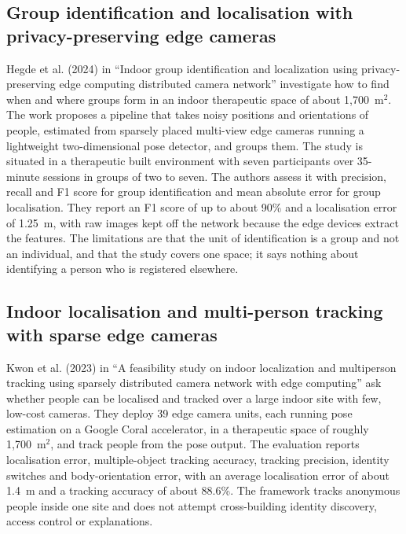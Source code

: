 \documentclass[12pt,a4paper,oneside]{report}
\begin{document}
\subsection{Group identification and localisation with privacy-preserving edge cameras}
Hegde et al. (2024) in ``Indoor group identification and localization using privacy-preserving edge computing distributed camera network'' \cite{ref1} investigate how to find when and where groups form in an indoor therapeutic space of about 1,700~m$^2$. The work proposes a pipeline that takes noisy positions and orientations of people, estimated from sparsely placed multi-view edge cameras running a lightweight two-dimensional pose detector, and groups them. The study is situated in a therapeutic built environment with seven participants over 35-minute sessions in groups of two to seven. The authors assess it with precision, recall and F1 score for group identification and mean absolute error for group localisation. They report an F1 score of up to about 90\% and a localisation error of 1.25~m, with raw images kept off the network because the edge devices extract the features. The limitations are that the unit of identification is a group and not an individual, and that the study covers one space; it says nothing about identifying a person who is registered elsewhere.

\subsection{Indoor localisation and multi-person tracking with sparse edge cameras}
Kwon et al. (2023) in ``A feasibility study on indoor localization and multiperson tracking using sparsely distributed camera network with edge computing'' \cite{ref2} ask whether people can be localised and tracked over a large indoor site with few, low-cost cameras. They deploy 39 edge camera units, each running pose estimation on a Google Coral accelerator, in a therapeutic space of roughly 1,700~m$^2$, and track people from the pose output. The evaluation reports localisation error, multiple-object tracking accuracy, tracking precision, identity switches and body-orientation error, with an average localisation error of about 1.4~m and a tracking accuracy of about 88.6\%. The framework tracks anonymous people inside one site and does not attempt cross-building identity discovery, access control or explanations.
\end{document}
